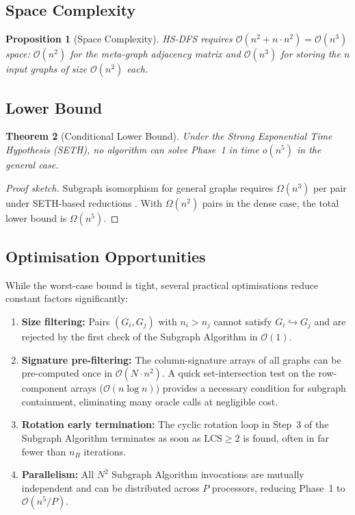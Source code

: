 ﻿\documentclass[12pt,a4paper]{article}
\theoremstyle{plain}
\newtheorem{theorem}{Theorem}[section]
\newtheorem{proposition}[theorem]{Proposition}
\theoremstyle{definition}
\theoremstyle{remark}
\begin{document}
	\subsection{Space Complexity}
	
	\begin{proposition}[Space Complexity]
		HS-DFS requires $\mathcal{O}(n^2 + n \cdot n^2) = \mathcal{O}(n^3)$ space:
		$\mathcal{O}(n^2)$ for the meta-graph adjacency matrix and
		$\mathcal{O}(n^3)$ for storing the $n$ input graphs of size $\mathcal{O}(n^2)$
		each.
	\end{proposition}
	
	\subsection{Lower Bound}
	
	\begin{theorem}[Conditional Lower Bound]
		Under the Strong Exponential Time Hypothesis (SETH), no algorithm can
		solve Phase~1 in time $o(n^5)$ in the general case.
	\end{theorem}
	
	\begin{proof}[Proof sketch]
		Subgraph isomorphism for general graphs requires $\Omega(n^3)$ per pair
		under SETH-based reductions \cite{williams2018}.  With $\Omega(n^2)$
		pairs in the dense case, the total lower bound is $\Omega(n^5)$.
	\end{proof}
	
	\subsection{Optimisation Opportunities}
	
	While the worst-case bound is tight, several practical optimisations reduce
	constant factors significantly:
	
	\begin{enumerate}[label=(\roman*)]
		\item \textbf{Size filtering:} Pairs $(G_i, G_j)$ with $n_i > n_j$
		cannot satisfy $G_i \hookrightarrow G_j$ and are rejected by the first
		check of the Subgraph Algorithm in $\mathcal{O}(1)$.
		\item \textbf{Signature pre-filtering:} The column-signature arrays of
		all graphs can be pre-computed once in $\mathcal{O}(N \cdot n^2)$.
		A quick set-intersection test on the row-component arrays
		($\mathcal{O}(n \log n)$) provides a necessary condition for subgraph
		containment, eliminating many oracle calls at negligible cost.
		\item \textbf{Rotation early termination:} The cyclic rotation loop in
		Step~3 of the Subgraph Algorithm terminates as soon as
		$\mathrm{LCS} \geq 2$ is found, often in far fewer than $n_B$ iterations.
		\item \textbf{Parallelism:} All $N^2$ Subgraph Algorithm invocations are
		mutually independent and can be distributed across $P$ processors,
		reducing Phase~1 to $\mathcal{O}(n^5 / P)$.
	\end{enumerate}
	
\end{document}
